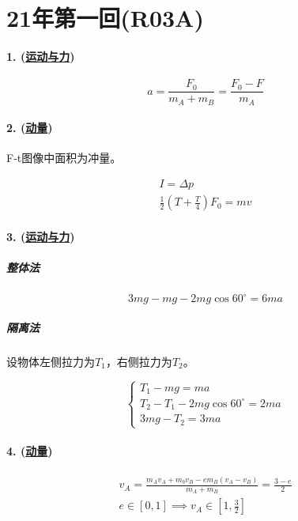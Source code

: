 
\section{21年第一回(R03A)}

\paragraph{1. (\hyperref[subsec:运动与力]{运动与力})}

\begin{equation*}
    a=\frac{F_0}{m_A+m_B}=\frac{F_0-F}{m_A}
\end{equation*}

\paragraph{2. (\hyperref[subsec:动量]{动量})} F-t图像中面积为冲量。

\begin{gather*}
    I=\Delta p\\
    \frac12(T+\frac{T}{4})F_0=mv
\end{gather*}

\paragraph{3. (\hyperref[subsec:运动与力]{运动与力})}

\subparagraph{整体法}

\begin{equation*}
    3mg-mg-2mg\cos60^\circ=6ma
\end{equation*}

\subparagraph{隔离法} 设物体左侧拉力为$T_1$，右侧拉力为$T_2$。

\begin{equation*}
    \begin{cases}
        T_1-mg=ma\\
        T_2-T_1-2mg\cos60^\circ=2ma\\
        3mg-T_2=3ma
    \end{cases}
\end{equation*}

\paragraph{4. (\hyperref[subsec:动量]{动量})}

\begin{gather*}
    v_A=\frac{m_Av_A+m_bv_B-em_B(v_A-v_B)}{m_A+m_B}=\frac{3-e}{2}\\
    e\in[0,1]\implies v_A\in\left[1,\frac32\right]
\end{gather*}

